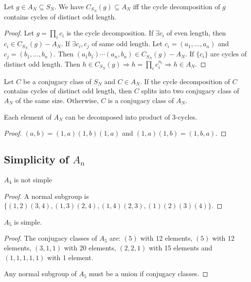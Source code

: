 \documentclass[12pt]{book}
\begin{document}
	\begin{theorem}
		Let $g\in A_N\subseteq S_N$. We have $C_{S_N}(g)\subseteq A_N$ iff the cycle decomposition of $g$ contains cycles of distinct odd length.
	\end{theorem}
	\begin{proof}
		Let $g=\prod_i c_i$ is the cycle decomposition. If $\exists c_i$ of even length, then $c_i\in C_{S_N}(g)-A_N$. If $\exists c_i,c_j$ of same odd length. Let $c_i=(a_1,\dots,a_n)$ and $c_j=(b_1,\dots,b_n)$. Then $(a_1 b_1)\cdots(a_n,b_n)\in C_{S_N}(g)-A_N$. If $\{c_i\}$ are cycles of distinct odd length. Then $h\in C_{S_N}(g)\Rightarrow h=\prod_i c_i^{n_i}\Rightarrow h\in A_N$.
	\end{proof}
	
	\begin{theorem}
		Let $C$ be a conjugacy class of $S_N$ and $C\in A_N$. If the cycle decomposition of $C$ contains cycles of distinct odd length, then $C$ splits into two conjugacy class of $A_N$ of the same size. Otherwise, $C$ is a conjugacy class of $A_N$.
		\label{thm:conj_an}
	\end{theorem}
	
	\begin{lemma}
		Each element of $A_N$ can be decomposed into product of 3-cycles.
	\end{lemma}
	\begin{proof}
		$(a,b)=(1,a)(1,b)(1,a)$ and $(1,a)(1,b)=(1,b,a)$.
	\end{proof}
\subsection{Simplicity of $A_n$}

\begin{lemma}
	$A_4$ is not simple
\end{lemma}
\begin{proof}
	A normal subgroup is $\{(1,2)(3,4),(1,3)(2,4),(1,4)(2,3),(1)(2)(3)(4)\}$.
\end{proof}

\begin{lemma}
	$A_5$ is simple.
\end{lemma}
\begin{proof}
	The conjugacy classes of $A_5$ are: $(5)$ with 12 elements, $(5)$ with 12 elements, $(3,1,1)$ with 20 elements, $(2,2,1)$ with 15 elements and $(1,1,1,1,1)$ with 1 element.
	
	Any normal subgroup of $A_5$ must be a union if conjugacy classes.
\end{proof}
\end{document}
